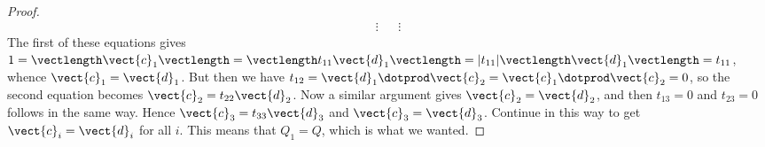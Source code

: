 \begin{proof}
\begin{equation*}
\begin{array}{ccl}
\vdots && \vdots
\end{array}
\end{equation*}
The first of these equations gives $1 = \vectlength \vect{c}_{1} \vectlength = \vectlength t_{11}\vect{d}_{1} \vectlength = | t_{11} | \vectlength \vect{d}_{1} \vectlength = t_{11}$, whence $\vect{c}_{1} = \vect{d}_{1}$. But then we have $t_{12} = \vect{d}_{1} \dotprod \vect{c}_{2} = \vect{c}_{1} \dotprod \vect{c}_{2} = 0$, so the second equation becomes $\vect{c}_{2} = t_{22}\vect{d}_{2}$. Now a similar argument gives $\vect{c}_{2} = \vect{d}_{2}$, and then $t_{13} = 0$ and $t_{23} = 0$ follows in the same way. Hence $\vect{c}_{3} = t_{33}\vect{d}_{3}$ and $\vect{c}_{3} = \vect{d}_{3}$. Continue in this way to get $\vect{c}_{i} = \vect{d}_{i}$ for all $i$. This means that $Q_{1} = Q$, which is what we wanted.
\end{proof}
